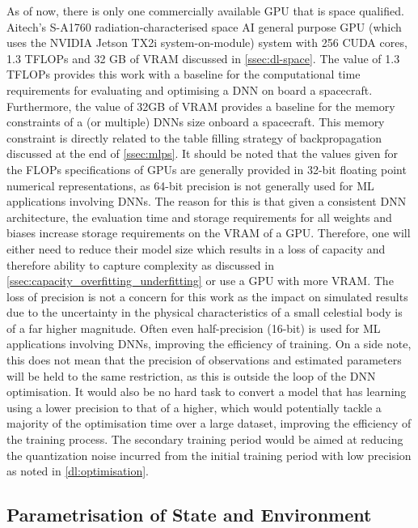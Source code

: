 As of now, there is only one commercially available \gls{GPU} that is space qualified. Aitech's S-A1760 radiation-characterised space \gls{AI} general purpose \gls{GPU} (which uses the NVIDIA Jetson TX2i system-on-module) system with 256 \gls{CUDA} cores, 1.3 \glspl{TFLOP} and 32 GB of \gls{VRAM} discussed in \autoref{ssec:dl-space}. The value of 1.3 \glspl{TFLOP} provides this work with a baseline for the computational time requirements for evaluating and optimising a \gls{DNN} on board a spacecraft. Furthermore, the value of 32GB of \gls{VRAM} provides a baseline for the memory constraints of a (or multiple) \glspl{DNN} size onboard a spacecraft. This memory constraint is directly related to the table filling strategy of backpropagation discussed at the end of \autoref{ssec:mlps}. It should be noted that the values given for the \glspl{FLOP} specifications of \glspl{GPU} are generally provided in 32-bit floating point numerical representations, as 64-bit precision is not generally used for \gls{ML} applications involving \glspl{DNN}. The reason for this is that given a consistent \gls{DNN} architecture, the evaluation time and storage requirements for all weights and biases increase storage requirements on the \gls{VRAM} of a \gls{GPU}. Therefore, one will either need to reduce their model size which results in a loss of capacity and therefore ability to capture complexity as discussed in \autoref{ssec:capacity_overfitting_underfitting} or use a \gls{GPU} with more \gls{VRAM}. The loss of precision is not a concern for this work as the impact on simulated results due to the uncertainty in the physical characteristics of a small celestial body is of a far higher magnitude. Often even half-precision (16-bit) is used for \gls{ML} applications involving \glspl{DNN}, improving the efficiency of training. On a side note, this does not mean that the precision of observations and estimated parameters will be held to the same restriction, as this is outside the loop of the \gls{DNN} optimisation. It would also be no hard task to convert a model that has learning using a lower precision to that of a higher, which would potentially tackle a majority of the optimisation time over a large dataset, improving the efficiency of the training process. The secondary training period would be aimed at reducing the quantization noise incurred from the initial training period with low precision as noted in \autoref{dl:optimisation}.

\subsection{Parametrisation of State and Environment}\label{ssec:insight:state-environment}

